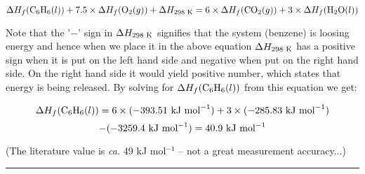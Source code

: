 $$\Delta H_f(\textnormal{C}_6\textnormal{H}_6(l)) + 7.5 \times \Delta H_f(\textnormal{O}_2(g)) + \Delta H_{298\textnormal{ K}} = 6 \times \Delta H_f(\textnormal{CO}_2(g)) + 3 \times \Delta H_f(\textnormal{H}_2\textnormal{O}(l))$$

Note that the '$-$' sign in $\Delta H_{298\textnormal{ K}}$ signifies that the system (benzene) is loosing energy and hence when we place it in the above equation $\Delta H_{298\textnormal{ K}}$ has a positive sign when it is put on the left hand side and negative when put on the right hand side. On the right hand side it would yield positive number, which states that energy is being released. By solving for $\Delta H_f(\textnormal{C}_6\textnormal{H}_6(l))$ from this equation we get:

$$\Delta H_f(\textnormal{C}_6\textnormal{H}_6(l)) = 6 \times (-393.51\textnormal{ kJ mol}^{-1}) + 3 \times (-285.83\textnormal{ kJ mol}^{-1})$$
$$ - (-3259.4\textnormal{ kJ mol}^{-1}) = 40.9\textnormal{ kJ mol}^{-1}$$

(The literature value is \textit{ca.} 49 kJ mol$^{-1}$ -- not a great measurement accuracy...)

\hrule\vspace{0.5cm}
